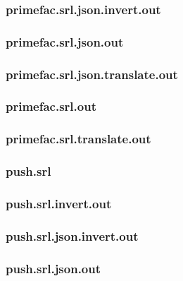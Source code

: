 \subsubsection{primefac.srl.json.invert.out}
\label{app:primefac_srl.json.invert.out}

\subsubsection{primefac.srl.json.out}
\label{app:primefac_srl.json.out}

\subsubsection{primefac.srl.json.translate.out}
\label{app:primefac_srl.json.translate.out}

\subsubsection{primefac.srl.out}
\label{app:primefac_srl.out}

\subsubsection{primefac.srl.translate.out}
\label{app:primefac_srl.translate.out}

\subsubsection{push.srl}
\label{app:push_srl}

\subsubsection{push.srl.invert.out}
\label{app:push_srl.invert.out}

\subsubsection{push.srl.json.invert.out}
\label{app:push_srl.json.invert.out}

\subsubsection{push.srl.json.out}
\label{app:push_srl.json.out}

